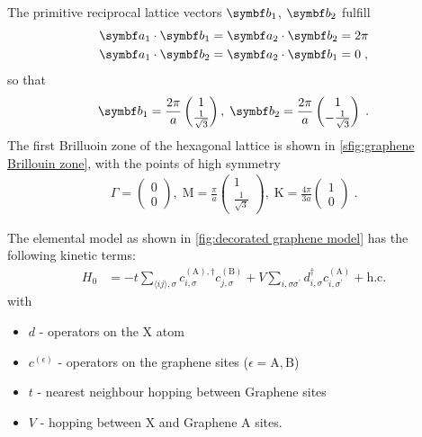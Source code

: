 \documentclass[../notes.tex]{subfiles}
\begin{document}
The primitive reciprocal lattice vectors \(\vb{b}_1\), \(\vb{b}_2\) fulfill
\begin{align}
	\vb{a}_1 \cdot \vb{b}_1 &= \vb{a}_2 \cdot \vb{b}_2 = 2\pi \\
	\vb{a}_1 \cdot \vb{b}_2 &= \vb{a}_2 \cdot \vb{b}_1 = 0\;,
\end{align}
so that
\begin{align}
	\vb{b}_1 = \frac{2\pi}{a} \begin{pmatrix} 1 \\ \frac{1}{\sqrt{3}} \end{pmatrix},\;
	\vb{b}_2 = \frac{2\pi}{a} \begin{pmatrix} 1 \\ - \frac{1}{\sqrt{3}} \end{pmatrix} \;.
\end{align}
The first Brilluoin zone of the hexagonal lattice is shown in \cref{sfig:graphene Brillouin zone}, with the points of high symmetry
\begin{align}
	\Gamma = \begin{pmatrix} 0 \\ 0 \end{pmatrix},\;
	\mathrm{M} = \frac{\pi}{a} \begin{pmatrix} 1 \\ \frac{1}{\sqrt{3}} \end{pmatrix},\;
	\mathrm{K} = \frac{4\pi}{3 a} \begin{pmatrix} 1 \\ 0 \end{pmatrix}\;.
\end{align}

The elemental model as shown in \cref{fig:decorated graphene model} has the following kinetic terms:
\begin{align}
	H_0 &= -t \sum_{\langle ij \rangle, \sigma}
	c_{i, \sigma}^{(\mathrm{A}), \dagger} c_{j, \sigma}^{(\mathrm{B})}
	+ V \sum_{i, \sigma \sigma^{\prime}}
	d_{i, \sigma}^{\dagger} c_{i, \sigma^{\prime}}^{(\mathrm{A})} + \mathrm{h.c.}
	\label{eq:EG-X model Hamiltonian non-interacting}
\end{align}
with
\begin{itemize}
	\item \(d\) - operators on the X atom
	\item \(c^{(\epsilon)}\) - operators on the graphene sites (\(\epsilon = \mathrm{A}, \mathrm{B}\))
	\item \(t\) - nearest neighbour hopping between Graphene sites
	\item \(V\) - hopping between \(\mathrm{X}\) and Graphene \(\mathrm{A}\) sites.
\end{itemize}
\end{document}
